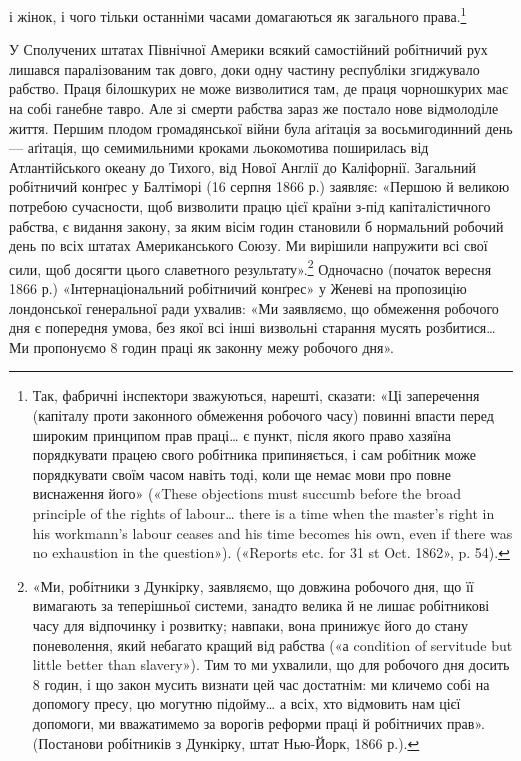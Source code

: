 і жінок, і чого тільки останніми часами домагаються як
загального права.\footnote{
Так, фабричні інспектори зважуються, нарешті, сказати: «Ці
заперечення (капіталу проти законного обмеження робочого часу) повинні
впасти перед широким принципом прав праці\dots{} є пункт, після якого право
хазяїна порядкувати працею свого робітника припиняється, і сам робітник
може порядкувати своїм часом навіть тоді, коли ще немає мови про повне
виснаження його» («These objections must succumb before the broad
principle of the rights of labour\dots{} there is a time when the master’s right
in his workmann’s labour ceases and his time becomes his own, even if
there was no exhaustion in the question»). («Reports etc. for 31 st Oct.
1862», p. 54).
}

У Сполучених штатах Північної Америки всякий самостійний
робітничий рух лишався паралізованим так довго, доки
одну частину республіки згиджувало рабство. Праця білошкурих
не може визволитися там, де праця чорношкурих має на собі
ганебне тавро. Але зі смерти рабства зараз же постало нове відмолоділе
життя. Першим плодом громадянської війни була аґітація
за восьмигодинний день — аґітація, що семимильними
кроками льокомотива поширилась від Атлантійського океану до
Тихого, від Нової Англії до Каліфорнії. Загальний робітничий
конґрес у Балтіморі (16 серпня 1866 р.) заявляє: «Першою й
великою потребою сучасности, щоб визволити працю цієї країни
з-під капіталістичного рабства, є видання закону, за яким вісім
годин становили б нормальний робочий день по всіх штатах Американського
Союзу. Ми вирішили напружити всі свої сили, щоб
досягти цього славетного результату».\footnote{
«Ми, робітники з Дункірку, заявляємо, що довжина робочого
дня, що її вимагають за теперішньої системи, занадто велика й не лишає
робітникові часу для відпочинку і розвитку; навпаки, вона принижує
його до стану поневолення, який небагато кращий від рабства («а condition
of servitude but little better than slavery»). Тим то ми ухвалили, що
для робочого дня досить 8 годин, і що закон мусить визнати цей час достатнім:
ми кличемо собі на допомогу пресу, цю могутню підойму\dots{} а
всіх, хто відмовить нам цієї допомоги, ми вважатимемо за ворогів реформи
праці й робітничих прав». (Постанови робітників з Дункірку, штат
Нью-Йорк, 1866 р.).
} Одночасно (початок
вересня 1866 р.) «Інтернаціональний робітничий конґрес» у Женеві
на пропозицію лондонської генеральної ради ухвалив: «Ми
заявляємо, що обмеження робочого дня є попередня умова, без
якої всі інші визвольні старання мусять розбитися\dots{} Ми пропонуємо
8 годин праці як законну межу робочого дня».


